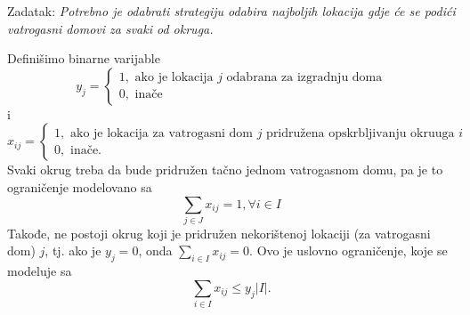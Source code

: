 \documentclass[a4paper, utf8, 11pt, colorlinks]{book}
\begin{document}
Zadatak: \emph{Potrebno je odabrati strategiju odabira najboljih lokacija gdje će se podići vatrogasni domovi za svaki od okruga.}

Definišimo binarne varijable 
$$y_j = \begin{cases}
              1, \mbox{ ako je lokacija } j \mbox{ odabrana za izgradnju doma} \\
              0, \mbox{ inače}
        \end{cases}$$
i 
$$
x_{ij}= \begin{cases}
             1, \mbox{ ako je lokacija za vatrogasni dom } j \mbox{ pridružena opskrbljivanju okruuga } i \\
             0, \mbox{ inače}. 
        \end{cases}
$$
Svaki okrug treba da bude pridružen tačno jednom vatrogasnom domu, pa je to ograničenje modelovano sa
\begin{equation}\label{eq:ex-constr-1}
      \sum_{j \in J} x_{ij} = 1, \forall i \in I
\end{equation}
Takođe, ne postoji okrug koji je pridružen nekorištenoj lokaciji (za vatrogasni dom) $j$, tj. ako je $y_j = 0$, onda $ \sum_{i \in I} x_{ij} = 0$. Ovo je uslovno ograničenje, koje se modeluje sa
\begin{equation}\label{eq:ex-constr-2}
    \sum_{i \in I} x_{ij} \leq y_j |I|.
 \end{equation}
\end{document}
